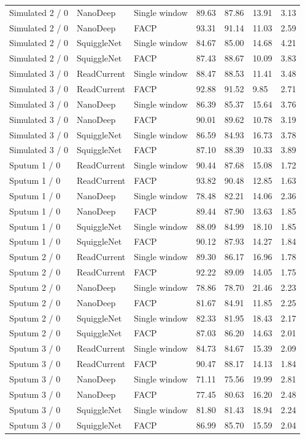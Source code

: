 \begin{longtable}{lllllll}
Simulated 2 / 0 & NanoDeep & Single window & 89.63 & 87.86 & 13.91 & 3.13\\
Simulated 2 / 0 & NanoDeep & FACP & 93.31 & 91.14 & 11.03 & 2.59\\
Simulated 2 / 0 & SquiggleNet & Single window & 84.67 & 85.00 & 14.68 & 4.21\\
Simulated 2 / 0 & SquiggleNet & FACP & 87.43 & 88.67 & 10.09 & 3.83\\
Simulated 3 / 0 & ReadCurrent & Single window & 88.47 & 88.53 & 11.41 & 3.48\\
Simulated 3 / 0 & ReadCurrent & FACP & 92.88 & 91.52 & 9.85 & 2.71\\
Simulated 3 / 0 & NanoDeep & Single window & 86.39 & 85.37 & 15.64 & 3.76\\
Simulated 3 / 0 & NanoDeep & FACP & 90.01 & 89.62 & 10.78 & 3.19\\
Simulated 3 / 0 & SquiggleNet & Single window & 86.59 & 84.93 & 16.73 & 3.78\\
Simulated 3 / 0 & SquiggleNet & FACP & 87.10 & 88.39 & 10.33 & 3.89\\
Sputum 1 / 0 & ReadCurrent & Single window & 90.44 & 87.68 & 15.08 & 1.72\\
Sputum 1 / 0 & ReadCurrent & FACP & 93.82 & 90.48 & 12.85 & 1.63\\
Sputum 1 / 0 & NanoDeep & Single window & 78.48 & 82.21 & 14.06 & 2.36\\
Sputum 1 / 0 & NanoDeep & FACP & 89.44 & 87.90 & 13.63 & 1.85\\
Sputum 1 / 0 & SquiggleNet & Single window & 88.09 & 84.99 & 18.10 & 1.85\\
Sputum 1 / 0 & SquiggleNet & FACP & 90.12 & 87.93 & 14.27 & 1.84\\
Sputum 2 / 0 & ReadCurrent & Single window & 89.30 & 86.17 & 16.96 & 1.78\\
Sputum 2 / 0 & ReadCurrent & FACP & 92.22 & 89.09 & 14.05 & 1.75\\
Sputum 2 / 0 & NanoDeep & Single window & 78.86 & 78.70 & 21.46 & 2.23\\
Sputum 2 / 0 & NanoDeep & FACP & 81.67 & 84.91 & 11.85 & 2.25\\
Sputum 2 / 0 & SquiggleNet & Single window & 82.33 & 81.95 & 18.43 & 2.17\\
Sputum 2 / 0 & SquiggleNet & FACP & 87.03 & 86.20 & 14.63 & 2.01\\
Sputum 3 / 0 & ReadCurrent & Single window & 84.73 & 84.67 & 15.39 & 2.09\\
Sputum 3 / 0 & ReadCurrent & FACP & 90.47 & 88.17 & 14.13 & 1.84\\
Sputum 3 / 0 & NanoDeep & Single window & 71.11 & 75.56 & 19.99 & 2.81\\
Sputum 3 / 0 & NanoDeep & FACP & 77.45 & 80.63 & 16.20 & 2.48\\
Sputum 3 / 0 & SquiggleNet & Single window & 81.80 & 81.43 & 18.94 & 2.24\\
Sputum 3 / 0 & SquiggleNet & FACP & 86.99 & 85.70 & 15.59 & 2.04\\
\end{longtable}
